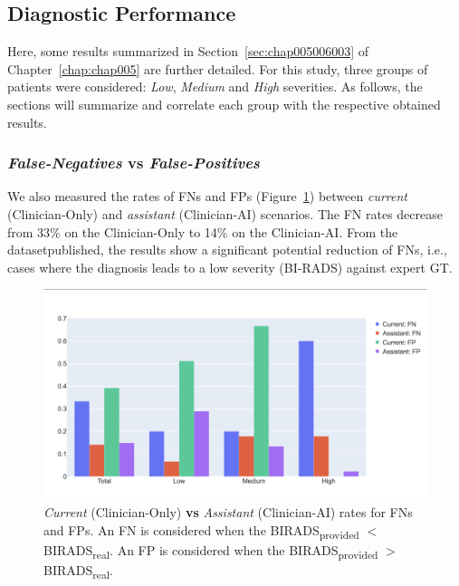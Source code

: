 \subsection{Diagnostic Performance}
\label{sec:app003004009}

Here, some results summarized in Section~\ref{sec:chap005006003} of Chapter~\ref{chap:chap005} are further detailed.
For this study, three groups of patients were considered: {\it Low}, {\it Medium} and {\it High} severities.
As follows, the sections will summarize and correlate each group with the respective obtained results.

\subsubsection{{\it False-Negatives} vs {\it False-Positives}}
\label{sec:app003004009001}

We also measured the rates of \acp{FN} and \acp{FP} (Figure~\ref{fig:fig038}) between {\it current} (Clinician-Only) and {\it assistant} (Clinician-AI) scenarios.
The \ac{FN} rates decrease from 33\% on the Clinician-Only to 14\% on the Clinician-AI.
From the dataset\footnotemark[27] published, the results show a significant potential reduction of \acp{FN}, i.e., cases where the diagnosis leads to a low severity (\ac{BI-RADS}) against expert \ac{GT}.


\begin{figure}[ht]
\centering
\includegraphics[width=\columnwidth]{images/fig038}
\caption{{\it Current} (Clinician-Only) {\bf vs} {\it Assistant} (Clinician-AI) rates for FNs and FPs. An FN is considered when the BIRADS\textsubscript{provided} $<$ BIRADS\textsubscript{real}. An FP is considered when the BIRADS\textsubscript{provided} $>$ BIRADS\textsubscript{real}.}
\label{fig:fig038}
\end{figure}

